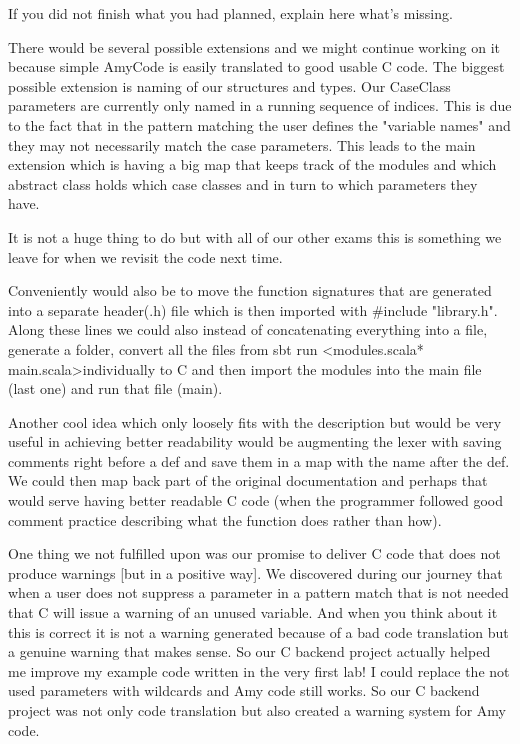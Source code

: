 If you did not finish what you had planned, explain here what's missing.


There would be several possible extensions and we might continue working on it because simple AmyCode is easily translated to good usable C code.
The biggest possible extension is naming of our structures and types. Our CaseClass parameters are currently only named in a running sequence of indices. This is due to the fact that in the pattern matching the user defines the "variable names" and they may not necessarily match the case parameters. This leads to the main extension which is having a big map that keeps track of the modules and which abstract class holds which case classes and in turn to which parameters they have.

It is not a huge thing to do but with all of our other exams this is something we leave for when we revisit the code next time.

Conveniently would also be to move the function signatures that are generated into a separate header(.h) file which is then imported with $\#$include "library.h".
Along these lines we could also instead of concatenating everything into a file, generate a folder, convert all the files from sbt run \textless modules.scala* main.scala\textgreater\space individually to C and then import the modules into the main file (last one) and run that file (main).

Another cool idea which only loosely fits with the description but would be very useful in achieving better readability would be augmenting the lexer with saving comments right before a def and save them in a map with the name after the def. We could then map back part of the original documentation and perhaps that would serve having better readable C code (when the programmer followed good comment practice describing what the function does rather than how).

One thing we not fulfilled upon was our promise to deliver C code that does not produce warnings [but in a positive way]. We discovered during our journey that when a user does not suppress a parameter in a pattern match that is not needed that C will issue a warning of an unused variable. And when you think about it this is correct it is not a warning generated because of a bad code translation but a genuine warning that makes sense. So our C backend project actually helped me improve my example code written in the very first lab! I could replace the not used parameters with wildcards and Amy code still works. So our C backend project was not only code translation but also created a warning system for Amy code.

